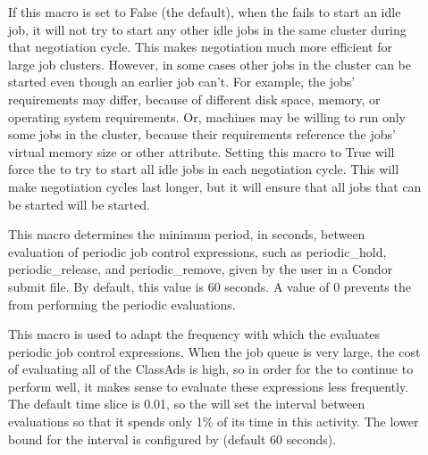 \begin{description}

\item[]
  \label{param:NegotiateAllJobsInCluster}
  If this macro is set to False (the default), when the  fails
  to start an idle job, it will not try to start any other
  idle jobs in the same cluster during that negotiation cycle.  This
  makes negotiation much more efficient for large job clusters.
  However, in some cases other jobs in the cluster can be started even
  though an earlier job can't.  For example, the jobs' requirements
  may differ, because of different disk space, memory, or
  operating system requirements.  Or, machines may be willing to run
  only some jobs in the cluster, because their requirements reference
  the jobs' virtual memory size or other attribute.  Setting this
  macro to True will force the  to try to start all idle jobs in
  each negotiation cycle.  This will make negotiation cycles last
  longer, but it will ensure that all jobs that can be started will be
  started.

\item[]
  \label{param:PeriodicExprInterval} This macro determines the minimum period,
  in seconds, between evaluation of periodic job control expressions,
  such as periodic\_hold, periodic\_release, and periodic\_remove,
  given by the user in a Condor submit file. By default, this value is
  60 seconds.  A value of 0 prevents the  from
  performing the periodic evaluations.

\item[]
  \label{param:PeriodicExprTimeslice} This macro is used to adapt the
  frequency with which the  evaluates periodic job
  control expressions.  When the job queue is very large, the cost of
  evaluating all of the ClassAds is high, so in order for the
   to continue to perform well, it makes sense to
  evaluate these expressions less frequently.  The default time slice
  is 0.01, so the  will set the interval between
  evaluations so that it spends only 1\% of its time in this activity.
  The lower bound for the interval is configured by
   (default 60 seconds).


\end{description}
